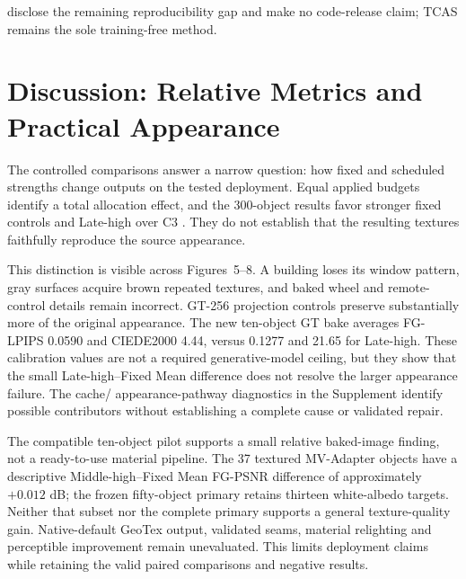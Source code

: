 \documentclass[times,twocolumn,final]{elsarticle}
\providecommand{\DIFadd}[1]{{\protect\color{blue} \sf #1}} %
\providecommand{\DIFaddbegin}{} %
\providecommand{\DIFaddend}{} %
\begin{document}
 \DIFaddbegin \DIFadd{disclose the remaining reproducibility gap and make no code-release claim; TCAS remains the sole training-free method}\DIFaddend .

  \DIFaddbegin \section{Discussion: Relative Metrics and Practical Appearance}
\DIFadd{The controlled comparisons answer a narrow question: how fixed and scheduled strengths change outputs on the tested deployment. Equal applied budgets identify a total allocation effect, and the 300-object results favor stronger fixed controls and Late-high over }\DIFaddend C3  . \DIFaddbegin \DIFadd{They do not establish that the resulting textures faithfully reproduce the source appearance.
}\DIFaddend 

  \DIFaddbegin \DIFadd{This distinction is visible across Figures~5--8. A building loses its window pattern, gray surfaces acquire brown repeated textures, }\DIFaddend and   \DIFaddbegin \DIFadd{baked wheel and remote-control details remain incorrect. GT-256 projection controls preserve substantially more of the original appearance. The new ten-object GT bake averages FG-LPIPS 0.0590 and CIEDE2000 4.44, versus 0.1277 and 21.65 for Late-high. These calibration values are not a required generative-model ceiling, but they show that the small Late-high--Fixed Mean difference does not resolve the larger appearance failure. The cache}\DIFaddend /  \DIFaddbegin \DIFadd{appearance-pathway diagnostics in the Supplement identify possible contributors without establishing a complete cause or validated repair.
}

\DIFadd{The compatible ten-object pilot supports a small relative baked-image finding, not a ready-to-use material pipeline. The 37 textured MV-Adapter objects have a descriptive Middle-high--Fixed Mean FG-PSNR difference of approximately $+0.012$ dB; the frozen fifty-object primary retains thirteen white-albedo targets. Neither that subset nor the complete primary supports a general texture-quality gain. Native-default GeoTex output}\DIFaddend ,   \DIFaddbegin \DIFadd{validated seams, material relighting and perceptible improvement remain unevaluated. This limits deployment claims while retaining the valid paired comparisons and negative results.
}\DIFaddend 
\end{document}
